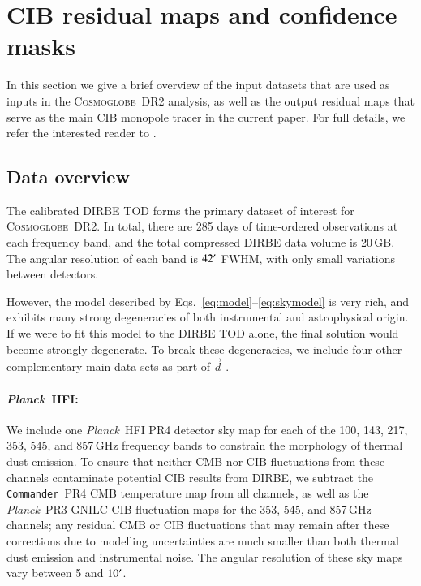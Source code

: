 \documentclass{aa}
\def\commander{\texttt{Commander}}
\def\Planck{\textit{Planck}}
\newcommand{\dv}[0]{\vec{d}}
\newcommand{\cosmoglobe}{\textsc{Cosmoglobe}}
\begin{document}
\section{CIB residual maps and confidence masks}
\label{sec:data}

In this section we give a brief overview of the input datasets that
are used as inputs in the \cosmoglobe\ DR2 analysis, as well as the
output residual maps that serve as the main CIB monopole tracer in the
current paper. For full details, we refer the interested reader to
\citet{CG02_01}. 

\subsection{Data overview}
\label{sec:datasummary}

The calibrated DIRBE TOD forms the primary dataset of interest for
\cosmoglobe\ DR2. In total, there are 285 days of time-ordered
observations at each frequency band, and the total compressed DIRBE
data volume is 20\,GB. The angular resolution of each band is
$42\arcm$ FWHM, with only small variations between detectors.

However, the model described by
Eqs.~\eqref{eq:model}--\eqref{eq:skymodel} is very rich, and exhibits
many strong degeneracies of both instrumental and astrophysical
origin. If we were to fit this model to the DIRBE TOD alone, the final
solution would become strongly degenerate. To break these
degeneracies, we include four other complementary main data sets as
part of $\dv$ \citep{CG02_01}.


\paragraph{\Planck\ HFI:} We include one \Planck\ HFI PR4 \citep{npipe} detector sky map for each of the 100, 143, 217,
  353, 545, and 857\,GHz frequency bands to constrain the morphology
  of thermal dust emission. To ensure that neither CMB nor CIB
  fluctuations from these channels contaminate potential CIB results
  from DIRBE, we subtract the \commander\ PR4 CMB temperature map
  from all channels, as well as the \Planck\ PR3 GNILC
  CIB fluctuation maps \citep{gnilc_cib} for the 353, 545, and 857\,GHz channels; any
  residual CMB or CIB fluctuations that may remain after these
  corrections due to modelling uncertainties are much smaller than
  both thermal dust emission and instrumental noise. The angular
  resolution of these sky maps vary between 5 and $10\arcm$.
\end{document}
